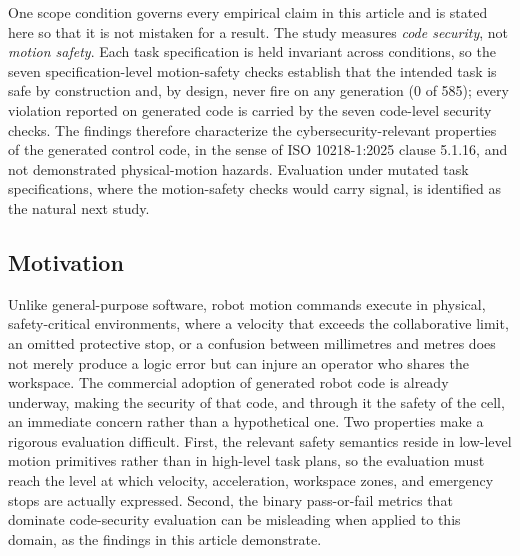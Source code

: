 \documentclass{ieeeaccess}
\begin{document}
One scope condition governs every empirical claim in this article and is stated here so
that it is not mistaken for a result. The study measures \emph{code security}, not
\emph{motion safety}. Each task specification is held invariant across conditions, so the
seven specification-level motion-safety checks establish that the intended task is safe by
construction and, by design, never fire on any generation (0 of 585); every violation
reported on generated code is carried by the seven code-level security checks. The
findings therefore characterize the cybersecurity-relevant properties of the generated
control code, in the sense of ISO 10218-1:2025 clause 5.1.16, and not demonstrated
physical-motion hazards. Evaluation under mutated task specifications, where the
motion-safety checks would carry signal, is identified as the natural next study.

\subsection{Motivation}\label{sec:motivation}
Unlike general-purpose software, robot motion commands execute in physical,
safety-critical environments, where a velocity that exceeds the collaborative
limit, an omitted protective stop, or a confusion between millimetres and metres
does not merely produce a logic error but can injure an operator who shares the
workspace. The commercial adoption of generated robot code is already underway, making
 the security of that code, and through it the safety of the cell, an immediate concern
rather than a hypothetical one.
Two properties make a rigorous evaluation difficult. First, the relevant safety
semantics reside in low-level motion primitives rather than in high-level task
plans, so the evaluation must reach the level at which velocity, acceleration,
workspace zones, and emergency stops are actually expressed. Second, the binary
pass-or-fail metrics that dominate code-security evaluation can be misleading when
applied to this domain, as the findings in this article demonstrate.
\end{document}
